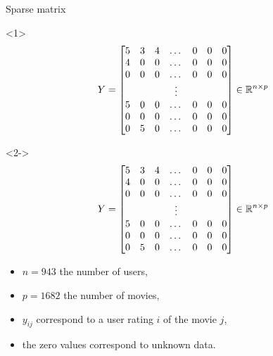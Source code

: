 \documentclass[unknownkeysallowed]{beamer}
\begin{document}
\begin{frame}{Sparse matrix}
\begin{onlyenv}<1>
    $$Y=\begin{bmatrix}
5 & 3 & 4 & \dots & 0 & 0 & 0\\
4 & 0 & 0 & \dots & 0 & 0 & 0\\
0 & 0 & 0 & \dots & 0 & 0 & 0\\
  &   &   & \vdots\\
5 & 0 & 0 & \dots & 0 & 0 & 0\\
0 & 0 & 0 & \dots & 0 & 0 & 0\\
0 & 5 & 0 & \dots & 0 & 0 & 0\\
\end{bmatrix} \in \mathbb{R}^{n \times p}$$
\end{onlyenv}
\begin{onlyenv}<2->
    $$Y=\begin{bmatrix}
5 & 3 & 4 & \dots & 0 & 0 & 0\\
4 & 0 & 0 & \dots & 0 & 0 & 0\\
0 & 0 & 0 & \dots & 0 & 0 & 0\\
  &   &   & \vdots\\
5 & 0 & 0 & \dots & 0 & 0 & 0\\
0 & 0 & 0 & \dots & 0 & 0 & 0\\
0 & 5 & 0 & \dots & 0 & 0 & 0\\
\end{bmatrix} \in \mathbb{R}^{n \times p}$$
\begin{itemize}
    \item $n=943$ the number of users,
    \item $p=1682$ the number of movies,
    \item $y_{ij}$ correspond to a user rating $i$ of the movie $j$,
    \item the zero values correspond to unknown data.
\end{itemize}
\end{onlyenv}
\end{frame}
\end{document}
